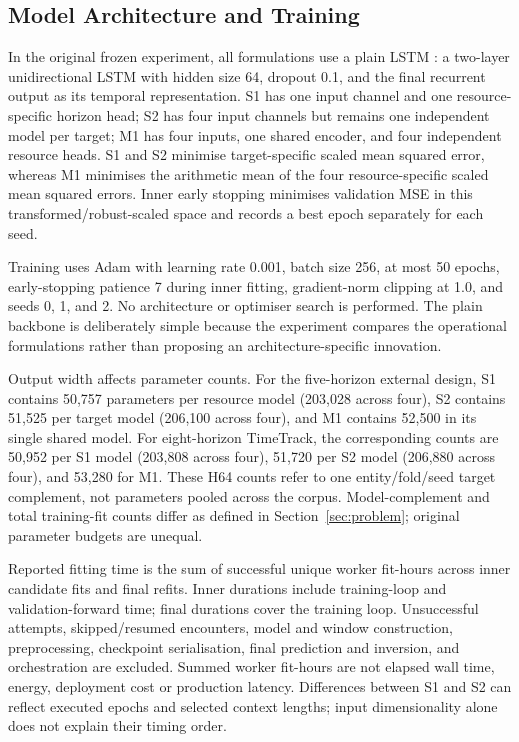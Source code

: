\documentclass[a4paper,fleqn]{cas-dc}
\begin{document}
\subsection{Model Architecture and Training}
\label{sec:architecture-training}

In the original frozen experiment, all formulations use a plain LSTM
\citep{Hochreiter1997LSTM}: a two-layer
unidirectional LSTM with hidden size 64, dropout 0.1, and the final recurrent
output as its temporal representation.  S1 has one input channel and one
resource-specific horizon head; S2 has four input channels but remains one
independent model per target; M1 has four inputs, one shared encoder, and four
independent resource heads.  S1 and S2 minimise target-specific scaled mean
squared error, whereas M1 minimises the arithmetic mean of the four
resource-specific scaled mean squared errors. Inner early stopping minimises
validation MSE in this transformed/robust-scaled space and records a best
epoch separately for each seed.

Training uses Adam with learning rate 0.001, batch size 256, at most 50 epochs,
early-stopping patience 7 during inner fitting, gradient-norm clipping at 1.0,
and seeds 0, 1, and 2.  No architecture or optimiser search is performed.  The
plain backbone is deliberately simple because the experiment compares the
operational formulations rather than proposing an architecture-specific
innovation.

Output width affects parameter counts.  For the five-horizon external design,
S1 contains 50,757 parameters per resource model (203,028 across four), S2
contains 51,525 per target model (206,100 across four), and M1 contains 52,500
in its single shared model.  For eight-horizon TimeTrack, the corresponding
counts are 50,952 per S1 model (203,808 across four), 51,720 per S2 model
(206,880 across four), and 53,280 for M1. These H64 counts refer to one
entity/fold/seed target complement, not parameters pooled across the corpus.
Model-complement and total training-fit counts differ as defined in
Section~\ref{sec:problem}; original parameter budgets are unequal.

Reported fitting time is the sum of successful unique worker fit-hours across
inner candidate fits and final refits. Inner durations include training-loop
and validation-forward time; final durations cover the training loop.
Unsuccessful attempts, skipped/resumed encounters, model and window
construction, preprocessing, checkpoint serialisation, final prediction and
inversion, and orchestration are excluded. Summed worker fit-hours are not
elapsed wall time, energy, deployment cost or production latency. Differences
between S1 and S2 can reflect executed epochs and selected context lengths;
input dimensionality alone does not explain their timing order.
\end{document}
